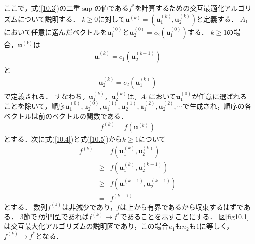 \documentclass{ltjsarticle}
\begin{document}
ここで，式(\ref{10.3})の二重$\sup$の値である$f^{*}$を計算するための交互最適化アルゴリズムについて説明する．
$k \geq 0$に対して$\mathbf{u}^{(k)} = ( \mathbf{u}_1^{(k)}, \mathbf{u}_2^{(k)} )$と定義する．
$A_1$において任意に選んだベクトルを$\mathbf{u}_1^{(0)}$と$\mathbf{u}_2^{(0)}=c_2 (\mathbf{u}_1^{(0)} )$する．
$k \geq 1$の場合，$\mathbf{u}^{(k)}$は
\begin{eqnarray}
  \label{10.7}
  \mathbf{u}_1^{(k)} = c_1 ( \mathbf{u}_2^{(k-1)} )
\end{eqnarray}
と
\begin{eqnarray}
  \label{10.8}
  \mathbf{u}_2^{(k)} = c_2 ( \mathbf{u}_1^{(k)} )
\end{eqnarray}
で定義される．
すなわち，$\mathbf{u}_1^{(k)}$，$\mathbf{u}_2^{(k)}$は，$A_1$において$\mathbf{u}_1^{(0)}$が任意に選ばれることを除いて，順序$\mathbf{u}_1^{(0)}, \mathbf{u}_2^{(0)}, \mathbf{u}_1^{(1)}, \mathbf{u}_2^{(1)}, \mathbf{u}_1^{(2)}, \mathbf{u}_2^{(2)}, \cdots$で生成され，順序の各ベクトルは前のベクトルの関数である．
\begin{eqnarray}
  \label{10.9}
  f^{(k)} = f( \mathbf{u}^{(k)})
\end{eqnarray}
とする．次に式(\ref{10.4})と式(\ref{10.5})から$k \geq 1$について
\begin{eqnarray}
  \label{10.10}
  f^{(k)} &=& f\left(\mathbf{u}_1^{(k)}, \mathbf{u}_2^{(k)}\right) \\
  \label{10.11}
  &\geq& f \left(\mathbf{u}_1^{(k)}, \mathbf{u}_2^{(k-1)}\right) \\
  \label{10.12} 
  &\geq& f \left(\mathbf{u}_1^{(k-1)}, \mathbf{u}_2^{(k-1)}\right) \\
  \label{10.13}
  &=& f^{(k-1)}
\end{eqnarray}
とする．
数列$f^{(k)}$は非減少であり，$f$は上から有界であるから収束するはずである．
3節で$f$が凹型であれば$f^{(k)} \rightarrow f^*$であることを示すことにする．
図\ref{fig10.1}は交互最大化アルゴリズムの説明図であり，この場合$n_1$も$n_2$も$1$に等しく，$f^{(k)} \rightarrow f^*$となる．
\end{document}
